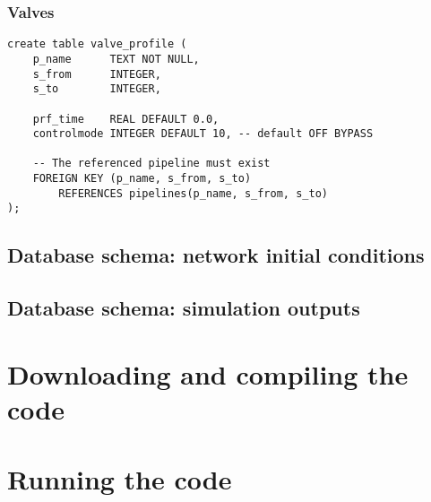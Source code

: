 \documentclass[10pt]{article}
\begin{document}
\subsubsection{Valves}
\begin{verbatim}
create table valve_profile (
    p_name      TEXT NOT NULL,
    s_from      INTEGER,
    s_to        INTEGER,

    prf_time    REAL DEFAULT 0.0,
    controlmode INTEGER DEFAULT 10, -- default OFF BYPASS

    -- The referenced pipeline must exist
    FOREIGN KEY (p_name, s_from, s_to)
        REFERENCES pipelines(p_name, s_from, s_to)
);
\end{verbatim}

\subsection{Database schema: network initial conditions}

\subsection{Database schema: simulation outputs}

\section{Downloading and compiling the code}

\section{Running the code}
\end{document}
